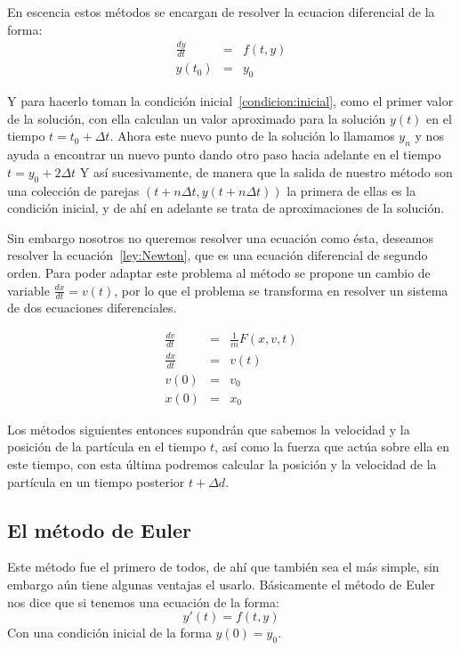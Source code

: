 En escencia estos métodos se encargan de resolver la ecuacion diferencial de la forma:
\begin{eqnarray}
 \frac{dy}{dt} & = &f(t,y) \nonumber \\
 y(t_0) & = & y_0 \label{condicion:inicial}
\end{eqnarray}

Y para hacerlo toman la condición inicial~\ref{condicion:inicial}, como el primer valor de la solución, con ella calculan un valor aproximado para la solución $y(t)$ en el tiempo $t = t_0 + \Delta t$. Ahora este nuevo punto de la solución lo llamamos $y_{n}$ y nos ayuda a encontrar un nuevo punto dando otro paso hacia adelante en el tiempo $t = y_0 + 2\Delta t$
Y así sucesivamente, de manera que la salida de nuestro método son una colección de parejas $(t + n \Delta t, y(t + n \Delta t) )$ la primera de ellas es la condición inicial, y de ahí en adelante se trata de aproximaciones de la solución.

Sin embargo nosotros no queremos resolver una ecuación como ésta, deseamos resolver la ecuación~\ref{ley:Newton}, que es una ecuación diferencial de segundo orden. Para poder adaptar este problema al método se propone un cambio de variable $\frac{dx}{dt} = v(t)$, por lo que el problema se transforma en resolver un sistema de dos ecuaciones diferenciales.

\begin{eqnarray}
\frac{dv}{dt} & = & \frac{1}{m} F(x, v, t) \nonumber \\
\frac{dx}{dt} & = & v(t) \nonumber \\
v(0) & = & v_0 \nonumber \\
x(0) & = & x_0 \nonumber
\end{eqnarray}

Los métodos siguientes entonces supondrán que sabemos la velocidad y la posición de la partícula en el tiempo $t$, así como la fuerza que actúa sobre ella en este tiempo, con esta última podremos calcular la posición y la velocidad de la partícula en un tiempo posterior $t + \Delta d$.

\subsection{El método de Euler}
Este método fue el primero de todos, de ahí que también sea el más simple, sin embargo aún tiene algunas ventajas el usarlo. Básicamente el método de Euler nos dice que si tenemos una ecuación de la forma:
$$y'(t) = f(t, y)$$
Con una condición inicial de la forma $y(0)=y_0$.

